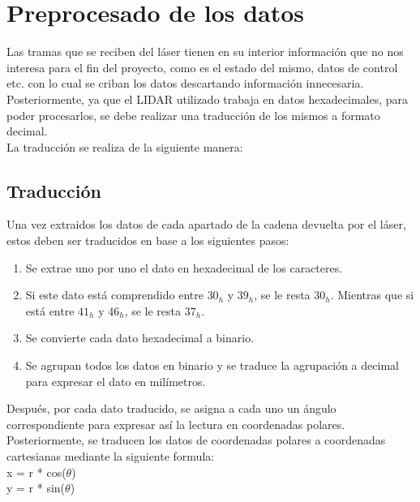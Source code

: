 \newpage
\section{Preprocesado de los datos}

Las tramas que se reciben del láser tienen en su interior información que no nos interesa para el fin del proyecto, como es el estado del mismo, datos de control etc. con lo cual se criban los datos descartando información innecesaria.\\


Posteriormente, ya que el LIDAR utilizado trabaja en datos hexadecimales, para poder procesarlos, se debe realizar una traducción de los mismos a formato decimal.\\
La traducción se realiza de la siguiente manera:\\
	\subsection{Traducción}

	Una vez extraidos los datos de cada apartado de la cadena devuelta por el láser, estos deben ser traducidos en base a los 			siguientes pasos:
	\begin{enumerate}
		\item Se extrae uno por uno el dato en hexadecimal de los caracteres.
		\item Si este dato está comprendido entre $30_{h}$ y  $39_{h}$, se le resta  $30_{h}$. Mientras que si está entre  				$41_{h}$ y  $46_{h}$, se le resta $37_{h}$.
		\item Se convierte cada dato hexadecimal a binario.
		\item Se agrupan todos los datos en binario y se traduce la agrupación a decimal para expresar el dato en milímetros.
	\end{enumerate}
	
	Después, por cada dato traducido, se asigna a cada uno un ángulo correspondiente para expresar así la lectura en coordenadas polares.\\
	Posteriormente, se traducen los datos de coordenadas polares a coordenadas cartesianas mediante la siguiente formula: \\

	x = r * cos(\(\theta\))\\
	y = r * sin(\(\theta\))\\


